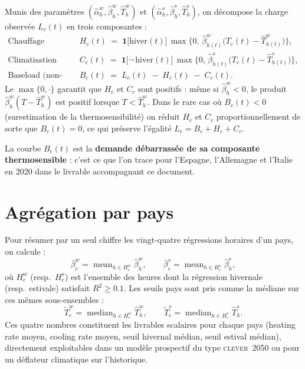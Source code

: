 \documentclass[11pt,a4paper]{article}
\begin{document}
Munis des param\`etres $(\hat\alpha_h^{w},\hat\beta_h^{w},\hat T_h^{w})$ et $(\hat\alpha_h^{s},\hat\beta_h^{s},\hat T_h^{s})$, on d\'ecompose la charge observ\'ee $L_c(t)$ en trois composantes :
\begin{align}
  \text{Chauffage (hiver) :} &\quad
  H_c(t)\;=\;\mathbf{1}\big[\text{hiver}(t)\big]\,\max\!\Big\{0,\,
    \hat\beta_{h(t)}^{w}\big(T_c(t)-\hat T_{h(t)}^{w}\big)\Big\},\label{eq:heating}\\[2pt]
  \text{Climatisation (\'et\'e) :} &\quad
  C_c(t)\;=\;\mathbf{1}\big[\neg\,\text{hiver}(t)\big]\,\max\!\Big\{0,\,
    \hat\beta_{h(t)}^{s}\big(T_c(t)-\hat T_{h(t)}^{s}\big)\Big\},\label{eq:cooling}\\[2pt]
  \text{Baseload (non-thermosensible) :} &\quad
  B_c(t)\;=\;L_c(t)\;-\;H_c(t)\;-\;C_c(t).\label{eq:baseload}
\end{align}
Le $\max\{0,\cdot\}$ garantit que $H_c$ et $C_c$ sont positifs : m\^eme si $\hat\beta_{h}^{w}<0$, le produit $\hat\beta_{h}^{w}(T-\hat T_h^{w})$ est positif lorsque $T<\hat T_h^{w}$. Dans le rare cas o\`u $B_c(t)<0$ (surestimation de la thermosensibilit\'e) on r\'eduit $H_c$ et $C_c$ proportionnellement de sorte que $B_c(t)=0$, ce qui pr\'eserve l'\'egalit\'e $L_c=B_c+H_c+C_c$.

La courbe $B_c(t)$ est la \textbf{demande d\'ebarrass\'ee de sa composante thermosensible} : c'est ce que l'on trace pour l'Espagne, l'Allemagne et l'Italie en 2020 dans le livrable accompagnant ce document.

\section{Agr\'egation par pays}

Pour r\'esumer par un seul chiffre les vingt-quatre r\'egressions horaires d'un pays, on calcule :
\begin{equation}
  \bar\beta_c^{w}=\operatorname{mean}_{h\in H_c^{w}}\hat\beta_h^{w},\qquad
  \bar\beta_c^{s}=\operatorname{mean}_{h\in H_c^{s}}\hat\beta_h^{s},
\end{equation}
o\`u $H_c^{w}$ (resp.\ $H_c^{s}$) est l'ensemble des heures dont la r\'egression hivernale (resp.\ estivale) satisfait $R^2\geq 0.1$. Les seuils pays sont pris comme la m\'ediane sur ces m\^emes sous-ensembles :
\begin{equation}
  \tilde T_c^{w}=\operatorname{median}_{h\in H_c^{w}}\hat T_h^{w},\qquad
  \tilde T_c^{s}=\operatorname{median}_{h\in H_c^{s}}\hat T_h^{s}.
\end{equation}
Ces quatre nombres constituent les livrables scalaires pour chaque pays (heating rate moyen, cooling rate moyen, seuil hivernal m\'edian, seuil estival m\'edian), directement exploitables dans un mod\`ele prospectif du type \textsc{clever}~2050 ou pour un d\'eflateur climatique sur l'historique.
\end{document}
